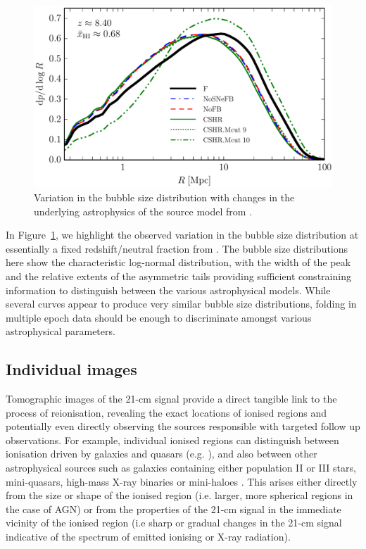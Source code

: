 \begin{figure}[]
\begin{center}
\includegraphics[trim = 0.2cm 1cm 0.2cm 0.2cm, scale = 0.45]{Greig/BSDVariation}
\end{center}
\caption{Variation in the bubble size distribution with changes in the underlying astrophysics of the source model from \cite{Geil:2016}.}
\label{fig:BSD}
\end{figure}

In Figure~\ref{fig:BSD}, we highlight the observed variation in the bubble size distribution at essentially a fixed redshift/neutral fraction from \cite{Geil:2016}. The bubble size distributions here show the characteristic log-normal distribution, with the width of the peak and the relative extents of the asymmetric tails providing sufficient constraining information to distinguish between the various astrophysical models. While several curves appear to produce very similar bubble size distributions, folding in multiple epoch data should be enough to discriminate amongst various astrophysical parameters.

\subsection{Individual images}

Tomographic images of the 21-cm signal provide a direct tangible link to the process of reionisation, revealing the exact locations of ionised regions and potentially even directly observing the sources responsible with targeted follow up observations. For example, individual ionised regions can distinguish between ionisation driven by galaxies and quasars (e.g. \cite{Datta:2012,Majumdar:2012}), and also between other astrophysical sources such as galaxies containing either population II or III stars, mini-quasars, high-mass X-ray binaries or mini-haloes \cite{Ghara:2016,Ghara:2017}. This arises either directly from the size or shape of the ionised region (i.e. larger, more spherical regions in the case of AGN) or from the properties of the 21-cm signal in the immediate vicinity of the ionised region (i.e sharp or gradual changes in the 21-cm signal indicative of the spectrum of emitted ionising or X-ray radiation).


